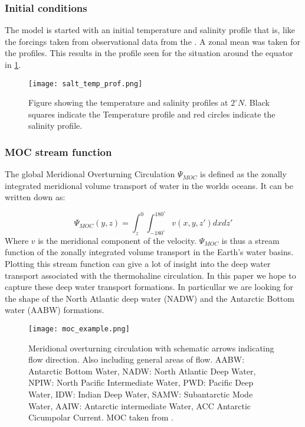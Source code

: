 \begin{multicols}{2}
 \subsubsection{Initial conditions}
The model is started with an initial temperature and salinity profile that is, like the forcings taken from observational data from the . A zonal mean was taken for the profiles. This results in the profile seen for the situation around the equator in \cref{fig:salt_temp_prf}.

\begin{figure}[H]
	\texttt{[image: salt\_temp\_prof.png]}
	\caption{Figure showing the temperature and salinity profiles at $2^{\circ} N$. Black squares indicate the Temperature profile and red circles indicate the salinity profile.}
	\label{fig:salt_temp_prf}
\end{figure}
 
 \subsubsection{MOC stream function} \label{sec:MOCSTREAM}
 
 The global Meridional Overturning Circulation $\Psi_{MOC}$ is defined as the zonally integrated meridional volume transport of water in the worlds oceans. It can be written down as:
 
 $$
 \Psi_{MOC}(y,z) = \int_{z}^{0} \int_{-180^{\circ}}^{180^{\circ}} v(x,y,z') dx dz'
 $$
Where $v$ is the meridional component of the velocity.
$ \Psi_{MOC}$ is thus a stream function of the zonally integrated volume transport in the Earth's water basins. Plotting this stream function can give a lot of insight into the deep water transport associated with the thermohaline circulation. In this paper we hope to capture these deep water transport formations. In particullar we are looking for the shape of the North Atlantic deep water (NADW) and the Antarctic Bottom water (AABW) formations.

 \begin{figure}[H]
	\texttt{[image: moc\_example.png]}
	\caption{Meridional overturning circulation with schematic arrows indicating flow direction. Also including general areas of flow. AABW: Antarctic Bottom Water, NADW: North Atlantic Deep Water, NPIW: North Pacific Intermediate Water,  PWD: Pacific Deep Water, IDW: Indian Deep Water, SAMW: Subantarctic Mode Water, AAIW: Antarctic intermediate Water, ACC Antarctic Cicumpolar Current. MOC taken from \cite{Forget2015Oct}.}
	\label{fig:moc_ex}
\end{figure}


\end{multicols}
